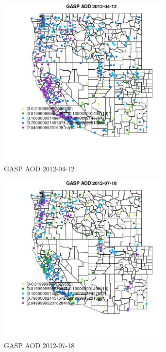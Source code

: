 \begin{figure} 
\centering  
\includegraphics[width=0.77\textwidth]{Code_Outputs/Report_ML_input_PM25_Step4_part_e_de_duplicated_aves_compiled_2019-05-14wNAs_MapObsGASP_AOD2012-04-12.jpg} 
\caption{\label{fig:Report_ML_input_PM25_Step4_part_e_de_duplicated_aves_compiled_2019-05-14wNAsMapObsGASP_AOD2012-04-12}GASP AOD 2012-04-12} 
\end{figure} 
 

\clearpage 

\begin{figure} 
\centering  
\includegraphics[width=0.77\textwidth]{Code_Outputs/Report_ML_input_PM25_Step4_part_e_de_duplicated_aves_compiled_2019-05-14wNAs_MapObsGASP_AOD2012-07-18.jpg} 
\caption{\label{fig:Report_ML_input_PM25_Step4_part_e_de_duplicated_aves_compiled_2019-05-14wNAsMapObsGASP_AOD2012-07-18}GASP AOD 2012-07-18} 
\end{figure} 
 

